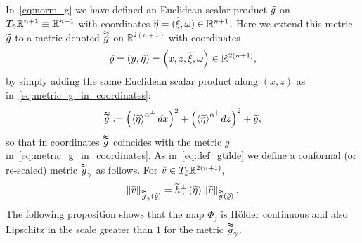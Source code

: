 \documentclass[AHL,Unicode,longabstracts,published]{cedram}
\newcommand{\bbR}{\mathbb{R}}
\let\oldtilde\tilde
\renewcommand*{\tilde}[1]{\mathchoice{\widetilde{#1}}{\widetilde{#1}}{\oldtilde{#1}}{\oldtilde{#1}}}
\newcommand{\bbR}{\mathbb{R}}
\begin{document}
In~\eqref{eq:norm_g} we have defined an Euclidean scalar product $\tilde{g}$ on $T_{\tilde{\eta}}\bbR^{n+1}\equiv\bbR^{n+1}$ with coordinates $\tilde{\eta}=(\tilde{\xi},\omega)\in\bbR^{n+1}$. Here we extend this metric $\tilde{g}$ to a metric denoted $\overset{\thickapprox}{g}$ on $\bbR^{2\left(n+1\right)}$ with coordinates
\[
\tilde{\varrho}=\left(y,\tilde{\eta}\right)=\left(x,z,\tilde{\xi},\omega\right)\in\bbR^{2\left(n+1\right)},
\]
by simply adding the same Euclidean scalar product along $(x,z)$ as in~\eqref{eq:metric_g_in_coordinates}:
\begin{equation}\label{eq:def_g_double_tilde}
\overset{\thickapprox}{g}:=\left(\left\langle \tilde{\eta}\right\rangle ^{\alpha^{\perp}}dx\right)^{2}+\left(\left\langle \tilde{\eta}\right\rangle ^{\alpha^{\parallel}}dz\right)^{2}+\tilde{g},
\end{equation}
so that in coordinates $\overset{\thickapprox}{g}$ coincides with the metric $g$ in~\eqref{eq:metric_g_in_coordinates}. As in~\eqref{eq:def_gtilde} we define a conformal (or re-scaled) metric $\overset{\thickapprox}{g}_{\gamma}$ as follows. For $\tilde{v}\in T_{\tilde{\varrho}}\bbR^{2(n+1)}$,
\begin{equation}\label{eq:def_gtilde-1}
\left\Vert \tilde{v}\right\Vert _{\overset{\thickapprox}{g}_{\gamma}\left(\tilde{\varrho}\right)}=\tilde{h}_{\gamma}^{\perp}\left(\tilde{\eta}\right)\left\Vert \tilde{v}\right\Vert _{\overset{\thickapprox}{g}\left(\tilde{\varrho}\right)}.
\end{equation}
The following proposition shows that the map $\Phi_{j}$ is H\"older continuous and also Lipschitz in the scale greater than $1$ for the metric $\overset{\thickapprox}{g}_{\gamma}$.
\end{document}
